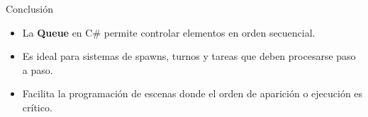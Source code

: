 \documentclass{beamer}
\begin{document}
\begin{frame}{Conclusión}
\begin{itemize}
    \item La \textbf{Queue} en C\# permite controlar elementos en orden secuencial.
    \item Es ideal para sistemas de spawns, turnos y tareas que deben procesarse paso a paso.
    \item Facilita la programación de escenas donde el orden de aparición o ejecución es crítico.
\end{itemize}
\end{frame}
\end{document}
